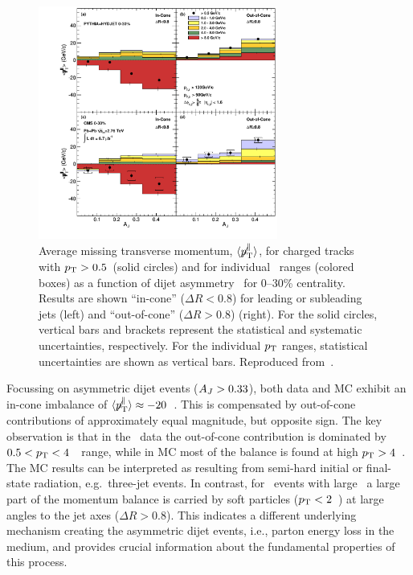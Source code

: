 \begin{figure}[!ht]
\begin{center}
\includegraphics[width=0.7\textwidth]{jetfigures/missingPtParallel-Corrected-data-InConeOutConeDPhiCut_ntv6_2.pdf}
\caption{Average missing transverse momentum,
$\langle \displaystyle{\not} p_{\mathrm{T}}^{\parallel} \rangle$,
for charged tracks with $\mbox{$p_{\mathrm{T}}$} > 0.5$\GeVc\ (solid circles) and for individual \pT\ ranges (colored boxes)
as a function of dijet asymmetry \AJ\ for 0--30\% centrality.
Results are shown ``in-cone'' ($\Delta R < 0.8$) for leading or subleading jets (left) and
``out-of-cone'' ($\Delta R > 0.8$) (right).
For the solid circles, vertical bars and brackets represent
the statistical and systematic uncertainties, respectively.
For the individual $\mbox{$p_{\mathrm{T}}$}$ ranges, statistical uncertainties are shown as vertical bars.
Reproduced from~\cite{Chatrchyan:2011sx}.}
\label{fig:GR:CMS_missingpT}
\end{center}
\end{figure}

Focussing on asymmetric dijet events ($A_J > 0.33$), both data and MC exhibit an
in-cone imbalance of $\langle \displaystyle{\not} p_{\mathrm{T}}^{\parallel} \rangle \approx
-20$~\GeVc. This is compensated by out-of-cone contributions of approximately equal magnitude,
but opposite sign. The key observation is that in the \PbPb\ data the out-of-cone contribution 
is dominated by $0.5 < \mbox{$p_{\mathrm{T}}$} < 4$~\GeVc\ range, while in MC most of the balance is found at high $\mbox{$p_{\mathrm{T}}$} > 4$~\GeVc. 
The MC results can be interpreted as resulting from semi-hard initial or final-state radiation, 
e.g.\ three-jet events.
In contrast, for \PbPb\ events with large \AJ\ a large part of the momentum balance is
carried by soft particles ($\mbox{$p_{\mathrm{T}}$} < 2$~\GeVc) at large angles to the jet axes ($\Delta R > 0.8$). 
This indicates a different underlying mechanism creating the asymmetric dijet events, i.e., 
parton energy loss in the medium, and provides crucial information about the fundamental 
properties of this process.

